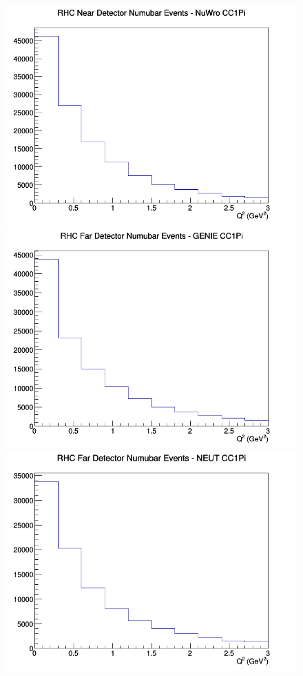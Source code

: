 \documentclass[12pt]{article}
\begin{document}
\begin{figure}[h]
\includegraphics[width=\linewidth]{eff_Q2/GAr/CC1Pi_RHC_ND_numubar_Q2_NuWro.png}
\endminipage
\newline
{}
\includegraphics[width=\linewidth]{eff_Q2/GAr/CC1Pi_RHC_FD_numubar_Q2_GENIE.png}
\endminipage
{}
\includegraphics[width=\linewidth]{eff_Q2/GAr/CC1Pi_RHC_FD_numubar_Q2_NEUT.png}

\end{figure}
\end{document}

